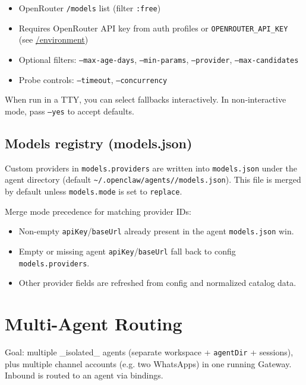 \begin{itemize}
  \item OpenRouter \texttt{/models} list (filter \texttt{:free})
  \item Requires OpenRouter API key from auth profiles or \texttt{OPENROUTER\_API\_KEY} (see \href{/help/environment}{/environment})
  \item Optional filters: \texttt{--max-age-days}, \texttt{--min-params}, \texttt{--provider}, \texttt{--max-candidates}
  \item Probe controls: \texttt{--timeout}, \texttt{--concurrency}
\end{itemize}


When run in a TTY, you can select fallbacks interactively. In non‑interactive
mode, pass \texttt{--yes} to accept defaults.

\subsection{Models registry (models.json)}


Custom providers in \texttt{models.providers} are written into \texttt{models.json} under the
agent directory (default \texttt{\textasciitilde{}/.openclaw/agents//models.json}). This file
is merged by default unless \texttt{models.mode} is set to \texttt{replace}.

Merge mode precedence for matching provider IDs:

\begin{itemize}
  \item Non-empty \texttt{apiKey}/\texttt{baseUrl} already present in the agent \texttt{models.json} win.
  \item Empty or missing agent \texttt{apiKey}/\texttt{baseUrl} fall back to config \texttt{models.providers}.
  \item Other provider fields are refreshed from config and normalized catalog data.
\end{itemize}



\clearpage

\section{Multi-Agent Routing}


Goal: multiple \_isolated\_ agents (separate workspace + \texttt{agentDir} + sessions), plus multiple channel accounts (e.g. two WhatsApps) in one running Gateway. Inbound is routed to an agent via bindings.

